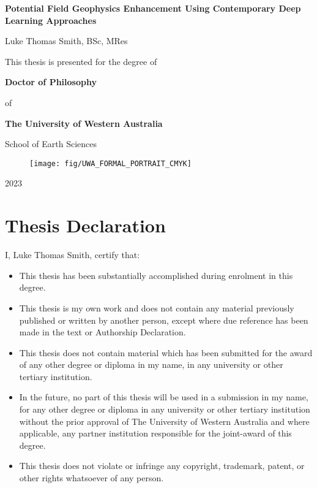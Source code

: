 \documentclass[12pt,a4paper]{report} %
\begin{document}
\begin{titlepage}

    \begin{center}
        \large{\textbf{Potential Field Geophysics Enhancement Using Contemporary Deep Learning Approaches}}

        \vspace{15 mm}
        {\large{Luke Thomas Smith, BSc, MRes}}

        \vspace{15 mm}
        This thesis is presented for the degree of

        \vspace{5 mm}
        \textbf{Doctor of Philosophy}

        of

        \textbf{The University of Western Australia}
        \vspace{5 mm}

        School of Earth Sciences
        \vspace{15 mm}

        \begin{figure}[h]
            \centering{}
            \texttt{[image: fig/UWA\_FORMAL\_PORTRAIT\_CMYK]}
        \end{figure}

        \vspace*{\fill}
        2023
    \end{center}
\end{titlepage}

\clearpage{}

\setcounter{page}{1}
\renewcommand{\thesection}{\Roman{section}}


\section{Thesis Declaration}
I, Luke Thomas Smith, certify that:
\begin{itemize}
    \item{}This thesis has been substantially accomplished during enrolment in this degree.
    \item{}This thesis is my own work and does not contain any material previously published or written by another person, except where due reference has been made in the text or Authorship Declaration.
    \item{}This thesis does not contain material which has been submitted for the award of any other degree or diploma in my name, in any university or other tertiary institution.
    \item{}In the future, no part of this thesis will be used in a submission in my name, for any other degree or diploma in any university or other tertiary institution without the prior approval of The University of Western Australia and where applicable, any partner institution responsible for the joint-award of this degree.
    \item{}This thesis does not violate or infringe any copyright, trademark, patent, or other rights whatsoever of any person.
\end{itemize}
\end{document}
